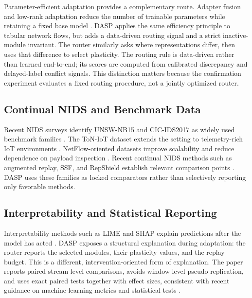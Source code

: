 \documentclass{ieeeaccess}
\begin{document}
Parameter-efficient adaptation provides a complementary route. Adapter fusion and low-rank adaptation reduce the number of trainable parameters while retaining a fixed base model \cite{Pfeiffer2020AdapterFusion,Hu2022LoRA,He2022DyLoRA}. DASP applies the same efficiency principle to tabular network flows, but adds a data-driven routing signal and a strict inactive-module invariant. The router similarly asks where representations differ, then uses that difference to select plasticity. The routing rule is data-driven rather than learned end-to-end; its scores are computed from calibrated discrepancy and delayed-label conflict signals. This distinction matters because the confirmation experiment evaluates a fixed routing procedure, not a jointly optimized router.

\subsection{Continual NIDS and Benchmark Data}
Recent NIDS surveys identify UNSW-NB15 and CIC-IDS2017 as widely used benchmark families \cite{Ali2024NIDSSurvey,Moustafa2015UNSW,Sharafaldin2018CICIDS}. The ToN-IoT dataset extends the setting to telemetry-rich IoT environments \cite{Moustafa2019ToNIoT}. NetFlow-oriented datasets improve scalability and reduce dependence on payload inspection \cite{Layeghy2022NFv2,Luay2025NetFlowV3,UQNIDSDatasets2025}. Recent continual NIDS methods such as augmented replay, SSF, and RepShield establish relevant comparison points \cite{Amalapuram2023NIDSReplay,Zhang2025SSF,Liu2026RepShield}. DASP uses these families as locked comparators rather than selectively reporting only favorable methods.

\subsection{Interpretability and Statistical Reporting}
Interpretability methods such as LIME and SHAP explain predictions after the model has acted \cite{Ribeiro2016LIME,Lundberg2017SHAP,Schwalbe2024XAITaxonomy}. DASP exposes a structural explanation during adaptation: the router reports the selected modules, their plasticity values, and the replay budget. This is a different, intervention-oriented form of explanation. The paper reports paired stream-level comparisons, avoids window-level pseudo-replication, and uses exact paired tests together with effect sizes, consistent with recent guidance on machine-learning metrics and statistical tests \cite{Rainio2024Metrics}.
\end{document}
